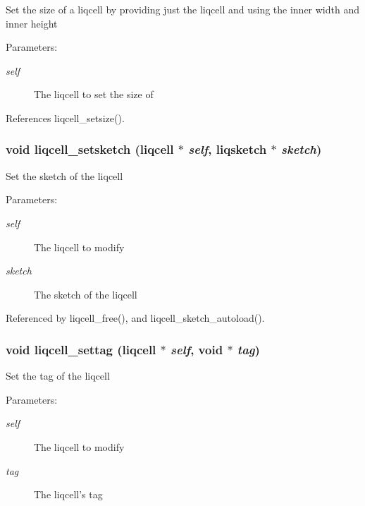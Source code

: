 Set the size of a liqcell by providing just the liqcell and using the inner width and inner height \begin{Desc}
\item[Parameters:]
\begin{description}
\item[{\em self}]The liqcell to set the size of \end{description}
\end{Desc}


References liqcell\_\-setsize().
\subsubsection[{liqcell\_\-setsketch}]{\setlength{\rightskip}{0pt plus 5cm}void liqcell\_\-setsketch (liqcell $\ast$ {\em self}, \/  liqsketch $\ast$ {\em sketch})}\label{d5/da2/liqcell_8c_ce2040e54a4088979505d65e05b5c266}


Set the sketch of the liqcell \begin{Desc}
\item[Parameters:]
\begin{description}
\item[{\em self}]The liqcell to modify \item[{\em sketch}]The sketch of the liqcell \end{description}
\end{Desc}


Referenced by liqcell\_\-free(), and liqcell\_\-sketch\_\-autoload().
\subsubsection[{liqcell\_\-settag}]{\setlength{\rightskip}{0pt plus 5cm}void liqcell\_\-settag (liqcell $\ast$ {\em self}, \/  void $\ast$ {\em tag})}\label{d5/da2/liqcell_8c_5fccdde8556d010dd81c15c69d070b55}


Set the tag of the liqcell \begin{Desc}
\item[Parameters:]
\begin{description}
\item[{\em self}]The liqcell to modify \item[{\em tag}]The liqcell's tag \end{description}
\end{Desc}


